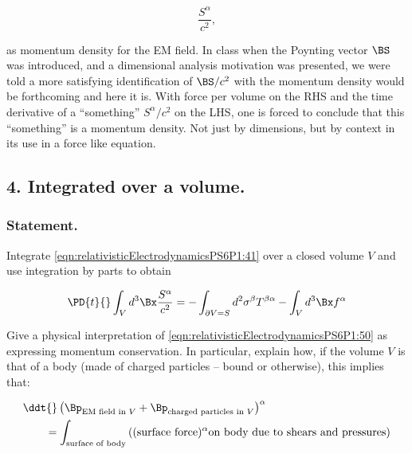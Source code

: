 \begin{equation}\label{eqn:relativisticElectrodynamicsPS6P1:203}
\frac{S^\alpha}{c^2},
\end{equation}

as momentum density for the EM field.  In class when the Poynting vector $\BS$ was introduced, and a dimensional analysis motivation was presented, we were told a more satisfying identification of $\BS/c^2$ with the momentum density would be forthcoming and here it is.  With force per volume on the RHS and the time derivative of a ``something'' $S^\alpha/c^2$ on the LHS, one is forced to conclude that this ``something'' is a momentum density.  Not just by dimensions, but by context in its use in a force like equation.

\subsection{4. Integrated over a volume.}

\subsubsection{Statement.}

Integrate \ref{eqn:relativisticElectrodynamicsPS6P1:41} over a closed volume $V$ and use integration by parts to obtain

\begin{equation}\label{eqn:relativisticElectrodynamicsPS6P1:50}
\PD{t}{} \int_V d^3 \Bx \frac{S^\alpha}{c^2} 
= 
- \int_{\partial V = S} d^2 \sigma^\beta T^{\beta \alpha} - \int_V d^3 \Bx f^\alpha 
\end{equation}

Give a physical interpretation of \ref{eqn:relativisticElectrodynamicsPS6P1:50} as expressing momentum conservation.  In particular, explain how, if the volume $V$ is that of a body (made of charged particles -- bound or otherwise), this implies that:

\begin{equation}\label{eqn:relativisticElectrodynamicsPS6P1:60}
\begin{aligned}
&\ddt{} \left( 
\Bp_{\text{EM field in $V$}} + 
\Bp_{\text{charged particles in $V$}} 
\right)^\alpha \\
&\qquad = \int_{\text{surface of body}} \left( 
(\text{surface force})^\alpha \text{on body due to shears and pressures}
\right)
\end{aligned}
\end{equation}


